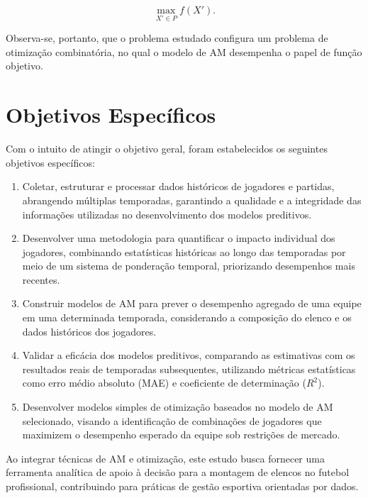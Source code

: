 \[
\max_{X' \in P} f(X').
\]

Observa-se, portanto, que o problema estudado configura um problema 
de otimização combinatória, no qual o modelo de AM desempenha o papel 
de função objetivo.

\section{Objetivos Específicos}

Com o intuito de atingir o objetivo geral, foram estabelecidos os 
seguintes objetivos específicos:

\begin{enumerate}
    \item Coletar, estruturar e processar dados históricos de 
    jogadores e partidas, abrangendo múltiplas temporadas, 
    garantindo a qualidade e a integridade das informações utilizadas 
    no desenvolvimento dos modelos preditivos.

    \item Desenvolver uma metodologia para quantificar o impacto 
    individual dos jogadores, combinando estatísticas históricas ao 
    longo das temporadas por meio de um sistema de ponderação temporal, 
    priorizando desempenhos mais recentes.

    \item Construir modelos de AM para prever o desempenho agregado 
    de uma equipe em uma determinada temporada, considerando a 
    composição do elenco e os dados históricos dos jogadores.

    \item Validar a eficácia dos modelos preditivos, comparando 
    as estimativas com os resultados reais de temporadas subsequentes, 
    utilizando métricas estatísticas como erro médio absoluto (MAE) e 
    coeficiente de determinação ($R^2$).

    \item Desenvolver modelos simples de otimização baseados no 
    modelo de AM selecionado, visando a identificação de combinações 
    de jogadores que maximizem o desempenho esperado da equipe 
    sob restrições de mercado.
\end{enumerate}

Ao integrar técnicas de AM e otimização, este estudo busca 
fornecer uma ferramenta analítica de apoio à decisão para a 
montagem de elencos no futebol profissional, contribuindo para 
práticas de gestão esportiva orientadas por dados.